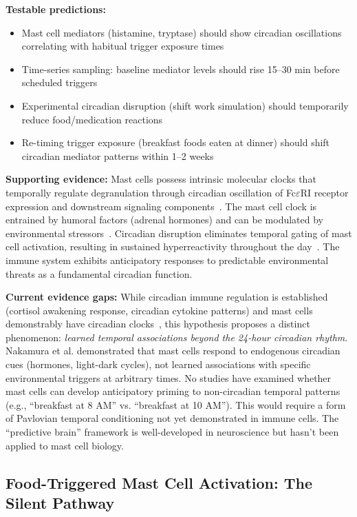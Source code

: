 \begin{open_question}
\textbf{Testable predictions:}
\begin{itemize}
    \item Mast cell mediators (histamine, tryptase) should show circadian oscillations correlating with habitual trigger exposure times
    \item Time-series sampling: baseline mediator levels should rise 15--30 min before scheduled triggers
    \item Experimental circadian disruption (shift work simulation) should temporarily reduce food/medication reactions
    \item Re-timing trigger exposure (breakfast foods eaten at dinner) should shift circadian mediator patterns within 1--2 weeks
\end{itemize}

\textbf{Supporting evidence:} Mast cells possess intrinsic molecular clocks that temporally regulate degranulation through circadian oscillation of Fc$\varepsilon$RI receptor expression and downstream signaling components~\cite{Nakamura2014}. The mast cell clock is entrained by humoral factors (adrenal hormones) and can be modulated by environmental stressors~\cite{Christ2018}. Circadian disruption eliminates temporal gating of mast cell activation, resulting in sustained hyperreactivity throughout the day~\cite{Nakao2018}. The immune system exhibits anticipatory responses to predictable environmental threats as a fundamental circadian function.

\textbf{Current evidence gaps:} While circadian immune regulation is established (cortisol awakening response, circadian cytokine patterns) and mast cells demonstrably have circadian clocks~\cite{Nakamura2014}, this hypothesis proposes a distinct phenomenon: \textit{learned temporal associations beyond the 24-hour circadian rhythm}. Nakamura et al. demonstrated that mast cells respond to endogenous circadian cues (hormones, light-dark cycles), not learned associations with specific environmental triggers at arbitrary times. No studies have examined whether mast cells can develop anticipatory priming to non-circadian temporal patterns (e.g., ``breakfast at 8 AM'' vs. ``breakfast at 10 AM''). This would require a form of Pavlovian temporal conditioning not yet demonstrated in immune cells. The ``predictive brain'' framework is well-developed in neuroscience but hasn't been applied to mast cell biology.
\end{open_question}

\subsection{Food-Triggered Mast Cell Activation: The Silent Pathway}
\label{subsec:food-mast-cell}

